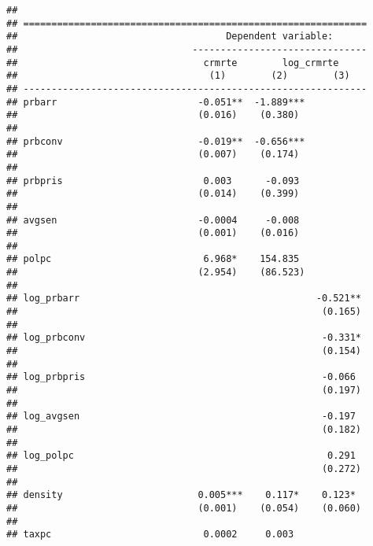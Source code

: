 \documentclass[
]{article}
\begin{document}
\begin{verbatim}
## 
## =============================================================
##                                     Dependent variable:      
##                               -------------------------------
##                                 crmrte        log_crmrte     
##                                  (1)        (2)        (3)   
## -------------------------------------------------------------
## prbarr                         -0.051**  -1.889***           
##                                (0.016)    (0.380)            
##                                                              
## prbconv                        -0.019**  -0.656***           
##                                (0.007)    (0.174)            
##                                                              
## prbpris                         0.003      -0.093            
##                                (0.014)    (0.399)            
##                                                              
## avgsen                         -0.0004     -0.008            
##                                (0.001)    (0.016)            
##                                                              
## polpc                           6.968*    154.835            
##                                (2.954)    (86.523)           
##                                                              
## log_prbarr                                          -0.521** 
##                                                      (0.165) 
##                                                              
## log_prbconv                                          -0.331* 
##                                                      (0.154) 
##                                                              
## log_prbpris                                          -0.066  
##                                                      (0.197) 
##                                                              
## log_avgsen                                           -0.197  
##                                                      (0.182) 
##                                                              
## log_polpc                                             0.291  
##                                                      (0.272) 
##                                                              
## density                        0.005***    0.117*    0.123*  
##                                (0.001)    (0.054)    (0.060) 
##                                                              
## taxpc                           0.0002     0.003             

\end{verbatim}
\end{document}
